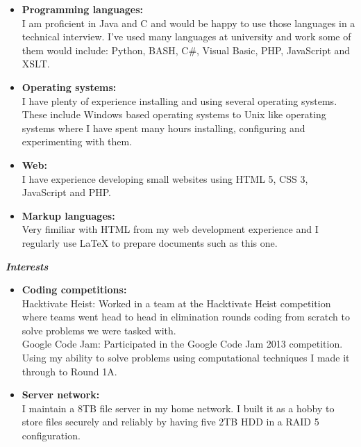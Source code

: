 \documentclass{res}
\begin{document}
\begin{resume}
   \begin{itemize} \itemsep -2pt %
   \item \textbf{Programming languages:} \\ \hfill I am proficient in Java and C and would be happy to use those languages in a technical interview.
   I've used many languages at university and work some of them would include: Python, BASH, C\#, Visual Basic, PHP, JavaScript and XSLT. 
   \item \textbf{Operating systems:} \\ \hfill I have plenty of experience installing and using several operating systems. These include Windows based operating systems to Unix like operating systems where I have spent many hours installing, configuring and experimenting with them.
   \item \textbf{Web:} \\ \hfill I have experience developing small websites using HTML 5, CSS 3, JavaScript and PHP.
   \item \textbf{Markup languages:} \\ Very fimiliar with HTML from my web development experience and I regularly use \LaTeX{} to prepare documents such as this one.

 \end{itemize}
 \vspace{0.2in} 
 {\sl \textbf{Interests}}
  
   \begin{itemize} \itemsep -2pt %
   \item \textbf{Coding competitions:} \\ \hfill Hacktivate Heist:
   Worked in a team at the Hacktivate Heist competition where teams
   went head to head in elimination rounds coding from scratch to
   solve problems we were tasked with.
   \\ Google Code Jam: Participated in the Google Code Jam 2013 
   competition. Using my ability to solve problems using computational 
   techniques I made it through to Round 1A.   
   \item \textbf{Server network:} \\ \hfill I maintain a 8TB file server 
   in my home network. I built it as a hobby to store files securely and 
   reliably by having five 2TB HDD in a RAID 5 configuration.   
 \end{itemize}
 
 
 
 

 
\end{resume} 
\end{document}
